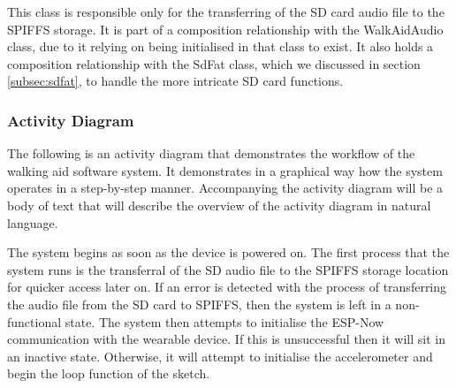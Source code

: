                             This class is responsible only for the transferring of the SD card audio file to the SPIFFS storage. It is part of a composition relationship with the WalkAidAudio class, due to it relying on being initialised in that class to exist. It also holds a composition relationship with the SdFat class, which we discussed in section \ref{subsec:sdfat}, to handle the more intricate SD card functions. 
                        
                        \newpage
        
                    \subsubsection{Activity Diagram}
                    \label{subsubsec:walking_aid_activity}
        
                        The following is an activity diagram that demonstrates the workflow of the walking aid software system. It demonstrates in a graphical way how the system operates in a step-by-step manner. Accompanying the activity diagram will be a body of text that will describe the overview of the activity diagram in natural language.
        
                        
                    
                        The system begins as soon as the device is powered on. The first process that the system runs is the transferral of the SD audio file to the SPIFFS storage location for quicker access later on. If an error is detected with the process of transferring the audio file from the SD card to SPIFFS, then the system is left in a non-functional state. The system then attempts to initialise the ESP-Now communication with the wearable device. If this is unsuccessful then it will sit in an inactive state. Otherwise, it will attempt to initialise the accelerometer and begin the loop function of the sketch. 
        
